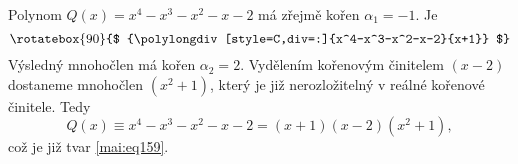 \begin{mdframed}[style=mdexam]
  \begin{example}\label{MAI:exam135} 
    Polynom \(Q(x) = x^4-x^3-x^2-x-2\) má zřejmě kořen \(\alpha_1=-1\). Je 
    \begin{equation*}
      \rotatebox{90}{$
        {\polylongdiv[style=C,div=:]{x^4-x^3-x^2-x-2}{x+1}}
      $}
    \end{equation*}
    Výsledný mnohočlen má kořen \(\alpha_2=2\). Vydělením kořenovým činitelem \((x-2)\) dostaneme
    mnohočlen \((x^2+1)\), který je již nerozložitelný v reálné kořenové činitele. Tedy
    \begin{equation*}
      Q(x) \equiv x^4-x^3-x^2-x-2 = (x+1)(x-2)(x^2+1), 
    \end{equation*}
    což je již tvar \ref{mai:eq159}.
  \end{example}
\end{mdframed}